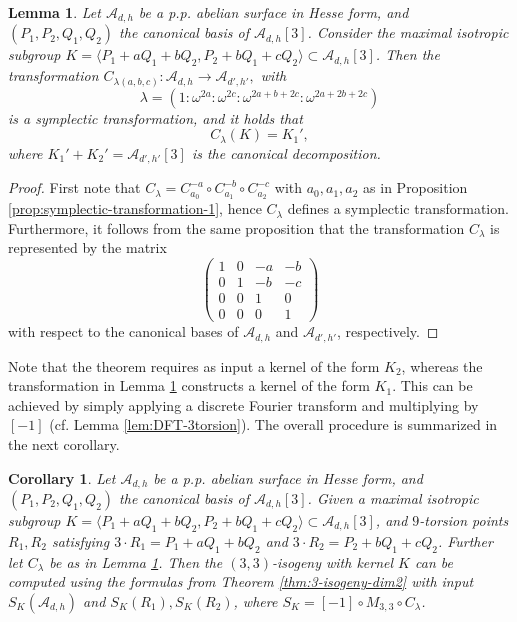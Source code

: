 \documentclass[11pt]{amsart}
\newtheorem{corollary}[theorem]{Corollary}
\newtheorem{lemma}[theorem]{Lemma}
\theoremstyle{definition}
\newcommand{\A}{\mathcal{A}}
\begin{document}
\begin{lemma} \label{lem:trafo-kernel} 
    Let $\A_{d,h}$ be a p.p. abelian surface in Hesse form, and $(P_1,P_2,Q_1,Q_2)$ the canonical basis of $\A_{d,h}[3]$. Consider the maximal isotropic subgroup $K = \langle P_1 + aQ_1 + bQ_2, P_2 + bQ_1 + cQ_2\rangle \subset \A_{d,h}[3]$. Then the transformation
    \(
    C_{\lambda(a,b,c)}: \A_{d,h}   \to \A_{d',h'},
    \)
    with
    \[
    \lambda = (1 : \omega^{2a}: \omega^{2c}: \omega^{2a+b+2c}: \omega^{2a+2b+2c})
    \]
    is a symplectic transformation, and it holds that 
    \[
    C_{\lambda}(K) = K_1',
    \]
    where $K_1' + K_2' = \A_{d',h'}[3]$ is the canonical decomposition.
\end{lemma}

\begin{proof}
    First note that $C_\lambda = C_{a_0}^{-a} \circ C_{a_1}^{-b} \circ C_{a_2}^{-c}$ with $a_0, a_1,a_2$ as in Proposition \ref{prop:symplectic-transformation-1}, hence $C_\lambda$ defines a symplectic transformation. Furthermore, it follows from the same proposition that the transformation $C_\lambda$ is represented by the matrix
    \[
    \begin{pmatrix}
        1 & 0 & -a & -b\\
        0 & 1 & -b & -c\\
        0 & 0 & 1 & 0\\
        0 & 0 & 0 & 1
    \end{pmatrix}
    \]
    with respect to the canonical bases of $\A_{d,h}$ and $\A_{d',h'}$, respectively.
\end{proof}

Note that the theorem requires as input a kernel of the form $K_2$, whereas the transformation in Lemma \ref{lem:trafo-kernel} constructs a kernel of the form $K_1$. This can be achieved by simply applying a discrete Fourier transform and multiplying by $[-1]$ (cf. Lemma \ref{lem:DFT-3torsion}).  The overall procedure is summarized in the next corollary.

\begin{corollary} \label{cor:isogeny-arbitrary}
    Let $\A_{d,h}$ be a p.p. abelian surface in Hesse form, and $(P_1,P_2,Q_1,Q_2)$ the canonical basis of $\A_{d,h}[3]$. Given a maximal isotropic subgroup $K = \langle P_1 + aQ_1 + bQ_2, P_2 + bQ_1 + cQ_2\rangle \subset \A_{d,h}[3]$, and $9$-torsion points $R_1,R_2$ satisfying $3 \cdot R_1 = P_1 + aQ_1 + bQ_2$ and $3\cdot R_2 = P_2 + bQ_1 + cQ_2$. Further let $C_\lambda$ be as in Lemma  \ref{lem:trafo-kernel}. Then the $(3,3)$-isogeny with kernel $K$ can be computed using the formulas from Theorem  \ref{thm:3-isogeny-dim2} with input $S_K(\A_{d,h})$ and $S_K(R_1), S_K(R_2)$, where $S_K = [-1] \circ M_{3,3} \circ C_\lambda$.
\end{corollary}
\end{document}
